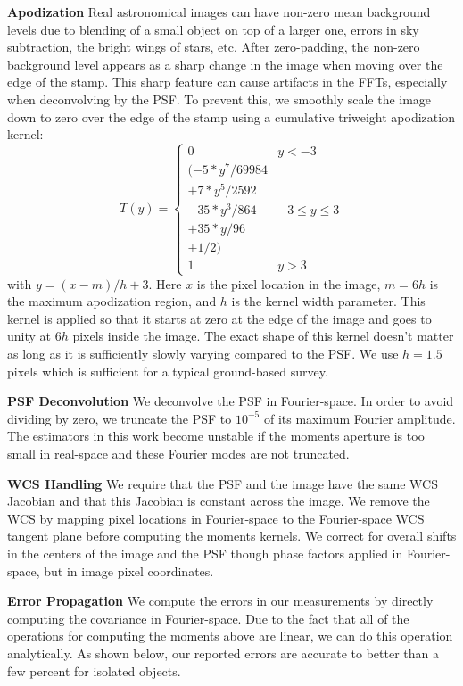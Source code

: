 \documentclass[twocolappendix, appendixfloats, numberedappendix, twocolumn, apj]{openjournal}
\begin{document}
\textbf{Apodization} Real astronomical images can have non-zero mean background levels
due to blending of a small object on top of a larger one, errors in sky subtraction,
the bright wings of stars, etc. After zero-padding, the non-zero background level appears
as a sharp change in the image when moving over the edge of the stamp. This sharp feature
can cause artifacts in the FFTs, especially when deconvolving by the PSF. To prevent this,
we smoothly scale the image down to zero over the edge of the stamp using a cumulative triweight
apodization kernel:
\begin{equation}
T(y) = \left\{
\begin{array}{cc}
0 & y < -3 \\
(-5 * y^7 / 69984 & \\
+ 7 * y^5 / 2592 & \\
- 35 * y^3 / 864 & -3 \le y \le 3 \\
+ 35 * y / 96 & \\
+ 1 / 2) &  \\
1 & y > 3
\end{array}
\right.
\end{equation}
with $y = (x-m)/h + 3$. Here $x$ is the pixel location in the image, $m=6h$ is the maximum
apodization region, and $h$ is the kernel width parameter. This kernel is applied so that it starts
at zero at the edge of the image and goes to unity at $6h$ pixels inside the image. The exact shape
of this kernel doesn't matter as long as it is sufficiently slowly varying compared to the PSF.
We use $h=1.5$ pixels which is sufficient for a typical ground-based survey.

\textbf{PSF Deconvolution} We deconvolve the PSF in Fourier-space. In order to avoid dividing by
zero, we truncate the PSF to $10^{-5}$ of its maximum Fourier amplitude. The estimators in this work
become unstable if the moments aperture is too small in real-space and these Fourier modes are not truncated.

\textbf{WCS Handling} We require that the PSF and the image have the same WCS Jacobian
and that this Jacobian is constant across the image. We remove the WCS by mapping pixel locations
in Fourier-space to the Fourier-space WCS tangent plane before computing the moments kernels.
We correct for overall shifts in the centers of the image and the PSF though phase factors applied
in Fourier-space, but in image pixel coordinates.

\textbf{Error Propagation} We compute the errors in our measurements by directly computing the
covariance in Fourier-space. Due to the fact that all of the operations for computing the moments
above are linear, we can do this operation analytically. As shown below, our reported errors are
accurate to better than a few percent for isolated objects.
\end{document}
